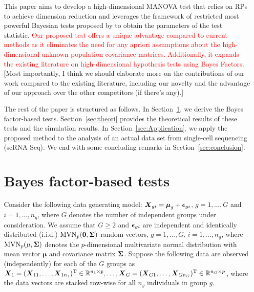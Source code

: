 \documentclass[times,sort&compress,3p]{elsarticle}
\theoremstyle{plain}%
\theoremstyle{definition}
\def\bzero{{\mathbf 0}}
\def\MVN{\hbox{MVN}}
\def\trans{^{\rm T}}
\def\bzero{{\mathbf 0}}
\newcommand{\uS}       {\mbox{\boldmath$S$}}
\newcommand{\uX}       {\mbox{\boldmath$X$}}
\newcommand{\uepsilon}          {\mbox{\boldmath$\epsilon$}}
\newcommand{\umu}               {\mbox{\boldmath$\mu$}}
\newcommand{\uSigma}            {\mbox{\boldmath$\Sigma$}}
\begin{document}
This paper aims to develop a high-dimensional MANOVA test that relies on RPs to achieve dimension reduction and leverages the framework of restricted most powerful Bayesian tests proposed by \cite{GoddardJohnson} to obtain the parameters of the test statistic. \textcolor{red}{Our proposed test offers a unique advantage compared to current methods as it eliminates the need for any apriori assumptions about the high-dimensional unknown population covariance matrices. Additionally, it expands the existing literature on high-dimensional hypothesis tests using Bayes Factors.} {\color{blue}[Most importantly, I think we should elaborate more on the contributions of our work compared to the existing literature, including our novelty and the advantage of our approach over the other competitors (if there's any).]}

The rest of the paper is structured as follows. In Section~\ref{sec:test}, we derive the Bayes factor-based tests. Section~\ref{sec:theori} provides the theoretical results of these tests and the simulation results. In Section~\ref{sec:Application}, we apply the proposed method to the analysis of an actual data set from single-cell sequencing (scRNA-Seq). We end with some concluding remarks in Section~\ref{sec:conclusion}. 
 

\section{Bayes factor-based tests} \label{sec:test}
Consider the following data generating model: $\uX_{gi} = \umu_g + \uepsilon_{gi}$, $g = 1, \ldots, G$ and $i=1, \ldots, n_{g}$, where $G$ denotes the number of independent groups under consideration. 
We assume that $G \geq 2$ and $\uepsilon_{gi}$ are independent and identically distributed (i.i.d.) $\MVN_{p}(\bzero, \uSigma)$ random vectors, $g = 1,\ldots,G$, $i = 1,\ldots,n_g$, where $\MVN_{p}(\mathbf{\mu},\uSigma)$ denotes the $p$-dimensional multivariate normal distribution with mean vector $\mathbf{\mu}$ and covariance matrix $\uSigma$. Suppose the following data are observed (independently) for each of the $G$ groups as $\uX_1 = (\uX_{11}, \ldots, \uX_{1n_1})\trans \in \mathbb{R}^{n_1 \times p}, \ldots,  \uX_G  = (\uX_{G1}, \ldots, \uX_{Gn_G})\trans \in \mathbb{R}^{n_G \times p}$, where the data vectors are stacked row-wise for all $n_g$ individuals in group $g$. %
\end{document}
